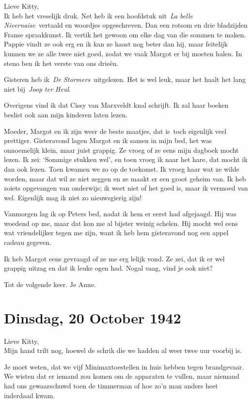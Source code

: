 \documentclass{book}
\begin{document}
Lieve Kitty,\\
Ik heb het vreselijk druk. Net heb ik een hoofdstuk uit~\emph{La
belle Nivernaise}~vertaald en woordjes opgeschreven. Dan een rotsom en drie
bladzijden Franse spraakkunst. Ik vertik het gewoon om elke dag van die sommen
te maken.  Pappie vindt ze ook erg en ik kan ze haast nog beter dan hij, maar
feitelijk kunnen we ze alle twee niet goed, zodat we vaak Margot er bij moeten
halen. In steno ben ik het verste van ons drieën.

Gisteren heb ik~\emph{De Stormers}~uitgelezen. Het is wel leuk, maar het haalt
het lang niet bij~\emph{Joop ter Heul}.

Overigens vind ik dat Cissy van Marxveldt knal schrijft. Ik zal haar boeken
beslist ook aan mijn kinderen laten lezen.

Moeder, Margot en ik zijn weer de beste maatjes, dat is~toch eigenlijk veel
prettiger. Gisteravond lagen Margot en ik samen in mijn bed, het was onnoemelijk
klein, maar juist grappig. Ze vroeg of ze eens mijn dagboek mocht lezen. Ik zei:
`Sommige stukken wel', en toen vroeg ik naar het hare, dat mocht ik dan ook
lezen. Toen kwamen we zo op de toekomst. Ik vroeg haar wat ze wilde worden, maar
dat wil ze niet zeggen en ze maakt er een groot geheim van. Ik heb zoiets
opgevangen van onderwijs; ik weet niet of het goed is, maar ik vermoed van wel.
Eigenlijk mag ik niet zo nieuwsgierig zijn!

Vanmorgen lag ik op Peters bed, nadat ik hem er eerst had afgejaagd. Hij was
woedend op me, maar dat kon me al bijster weinig schelen. Hij mocht wel eens wat
vriendelijker tegen me zijn, want ik heb hem gisteravond nog een appel cadeau
gegeven.

Ik heb Margot eens gevraagd of ze me erg lelijk vond. Ze zei, dat ik er wel
grappig uitzag en dat ik leuke ogen had. Nogal vaag, vind je ook niet?

Tot de volgende keer. Je Anne.

\section*{Dinsdag, 20 October 1942}

Lieve Kitty,\\
Mijn hand trilt nog, hoewel de schrik die we hadden al weer twee
uur voorbij is.

Je moet weten, dat we vijf Minimaxtoestellen in huis hebben tegen brandgevaar.
We wisten dat er iemand zou komen om de apparaten te vullen, maar niemand had
ons gewaarschuwd toen de timmerman of hoe zo'n man anders heet inderdaad kwam.
\end{document}
